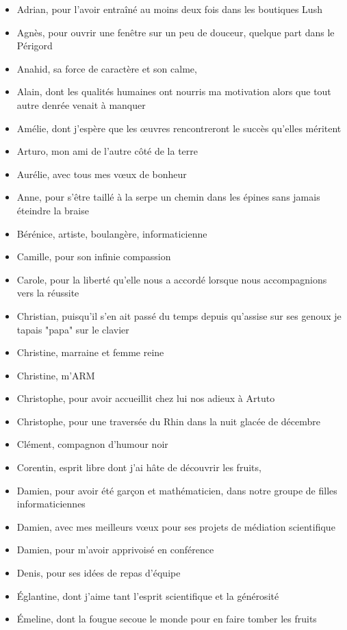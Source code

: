 {\begin{itemize}[label=\ ]
\item Adrian, pour l'avoir entraîné au moins deux fois dans les boutiques Lush 
\item Agnès, pour ouvrir une fenêtre sur un peu de douceur, quelque part dans le Périgord
\item Anahid, sa force de caractère et son calme,  
\item Alain, dont les qualités humaines ont nourris ma motivation alors que tout autre denrée venait à manquer
\item Amélie, dont j'espère que les œuvres rencontreront le succès qu'elles méritent 
\item Arturo, mon ami de l'autre côté de la terre
\item Aurélie, avec tous mes vœux de bonheur 
\item Anne, pour s'être taillé à la serpe un chemin dans les épines sans jamais éteindre la braise 
\item Bérénice, artiste, boulangère, informaticienne 
\item Camille, pour son infinie compassion 
\item Carole, pour la liberté qu'elle nous a accordé lorsque nous accompagnions vers la réussite
\item Christian, puisqu'il s'en ait passé du temps depuis qu'assise sur ses genoux je tapais "papa" sur le clavier
\item Christine, marraine et femme reine
\item Christine, m'ARM 
\item Christophe, pour avoir accueillit chez lui nos adieux à Artuto
\item Christophe, pour une traversée du Rhin dans la nuit glacée de décembre 
\item Clément, compagnon d'humour noir
\item Corentin, esprit libre dont j'ai hâte de découvrir les fruits,
\item Damien, pour avoir été garçon et mathématicien, dans notre groupe de filles informaticiennes
\item Damien, avec mes meilleurs vœux pour ses projets de médiation scientifique 
\item Damien, pour m'avoir apprivoisé en conférence
\item Denis, pour ses idées de repas d'équipe 
\item Églantine, dont j'aime tant l'esprit scientifique et la générosité
\item Émeline, dont la fougue secoue le monde pour en faire tomber les fruits

\end{itemize}}
